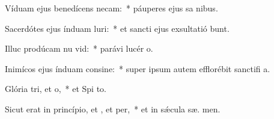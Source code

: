 \item Víduam ejus benedícens necam:~* páuperes ejus sa nibus.
\item Sacerdótes ejus índuam luri:~* et sancti ejus exsultatió bunt.
\item Illuc prodúcam nu vid:~* parávi lucér  o.
\item Inimícos ejus índuam consine:~* super ipsum autem efflorébit sanctifi a.
\item Glória tri, et o,~* et Spi to.
\item Sicut erat in princípio, et , et per,~* et in sǽcula sæ. men.
